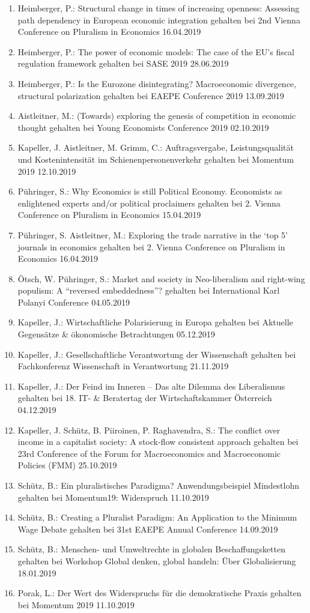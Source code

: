 \begin{enumerate}
	\item Heimberger, P.: Structural change in times of increasing openness: Assessing path dependency in European economic integration gehalten bei 2nd Vienna Conference on Pluralism in Economics 16.04.2019
	\item Heimberger, P.: The power of economic models: The case of the EU's fiscal regulation framework gehalten bei SASE 2019 28.06.2019
	\item Heimberger, P.: Is the Eurozone disintegrating? Macroeconomic divergence, structural polarization gehalten bei EAEPE Conference 2019 13.09.2019
	\item Aistleitner, M.: (Towards) exploring the genesis of competition in economic thought gehalten bei Young Economists Conference 2019 02.10.2019
	\item Kapeller, J. Aistleitner, M. Grimm, C.: Auftragsvergabe, Leistungsqualität und Kostenintensität im Schienenpersonenverkehr gehalten bei Momentum 2019 12.10.2019
	\item Pühringer, S.: Why Economics is still Political Economy. Economists as enlightened experts and/or political proclaimers gehalten bei 2. Vienna Conference on Pluralism in Economics 15.04.2019
	\item Pühringer, S. Aistleitner, M.: Exploring the trade narrative in the ‘top 5’ journals in economics gehalten bei 2. Vienna Conference on Pluralism in Economics 16.04.2019
	\item Ötsch, W. Pühringer, S.: Market and society in Neo-liberalism and right-wing populism: A “reversed embeddedness”? gehalten bei International Karl Polanyi Conference 04.05.2019
	\item Kapeller, J.: Wirtschaftliche Polarisierung in Europa gehalten bei Aktuelle Gegensätze \& ökonomische Betrachtungen 05.12.2019
	\item Kapeller, J.: Gesellschaftliche Verantwortung der Wissenschaft gehalten bei Fachkonferenz Wissenschaft in Verantwortung 21.11.2019
	\item Kapeller, J.: Der Feind im Inneren – Das alte Dilemma des Liberalismus gehalten bei 18. IT- \& Beratertag der Wirtschaftskammer Österreich 04.12.2019
	\item Kapeller, J.   Schütz, B. Piiroinen, P. Raghavendra, S.: The conflict over income in a capitalist society: A stock-flow consistent approach gehalten bei 23rd Conference of the Forum for Macroeconomics and Macroeconomic Policies (FMM) 25.10.2019
	\item Schütz, B.: Ein pluralistisches Paradigma? Anwendungsbeispiel Mindestlohn gehalten bei Momentum19: Widerspruch 11.10.2019
	\item Schütz, B.: Creating a Pluralist Paradigm: An Application to the Minimum Wage Debate gehalten bei 31st EAEPE Annual Conference 14.09.2019
	\item Schütz, B.: Menschen- und Umweltrechte in globalen Beschaffungsketten gehalten bei Workshop Global denken, global handeln: Über Globalisierung 18.01.2019
	\item Porak, L.: Der Wert des Widerspruchs für die demokratische Praxis gehalten bei Momentum 2019 11.10.2019
\end{enumerate}
